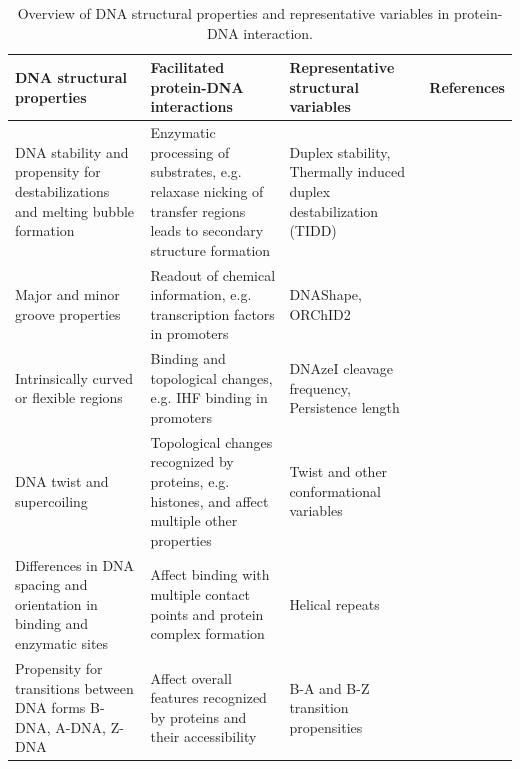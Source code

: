 \documentclass[sigconf]{acmart}
\begin{document}
\begin{table}
  \caption{Overview of DNA structural properties and representative variables in protein-DNA interaction.}
  \begin{tabular}{p{5cm}|p{5cm}|p{5cm}|p{1.5cm}}
    \toprule
    DNA structural properties & Facilitated protein-DNA interactions & Representative structural variables & References\\
    \midrule
    DNA stability and propensity for destabilizations and melting bubble formation & Enzymatic processing of substrates, e.g. relaxase nicking of transfer regions\; leads to secondary structure formation & Duplex stability, Thermally induced duplex destabilization (TIDD) & \cite{SantaLucia1998-hc,Lucas2010-gi,Zrimec2015-xf,Sut2009-kg}\\
    Major and minor groove properties & Readout of chemical information, e.g. transcription factors in promoters & DNAShape, ORChID2 & \cite{Rohs2009-hm,Chiu2016-kb,Bishop2011-jm,Watson2008-dt}\\
    Intrinsically curved or flexible regions & Binding and topological changes, e.g. IHF binding in promoters & DNAzeI cleavage frequency, Persistence length & \cite{Brukner1995-pt,Geggier2010-mw,Moncalian1999-qj}\\
    DNA twist and supercoiling & Topological changes recognized by proteins, e.g. histones, and affect multiple other properties & Twist and other conformational variables & \cite{Karas1996-qz,Olson1998-rw,Perez2004-sx,Watson2008-dt}\\
    Differences in DNA spacing and orientation in binding and enzymatic sites & Affect binding with multiple contact points and protein complex formation & Helical repeats & \cite{Williams2007-be,Geggier2010-mw,Watson2008-dt}\\
    Propensity for transitions between DNA forms B-DNA, A-DNA, Z-DNA & Affect overall features recognized by proteins and their accessibility & B-A and B-Z transition propensities & \cite{Aida1988-iq,Ho1986-hg,Hartmann1989-ji,Kulkarni2013-xm}\\
    \bottomrule
  \end{tabular}
\end{table}
\end{document}
